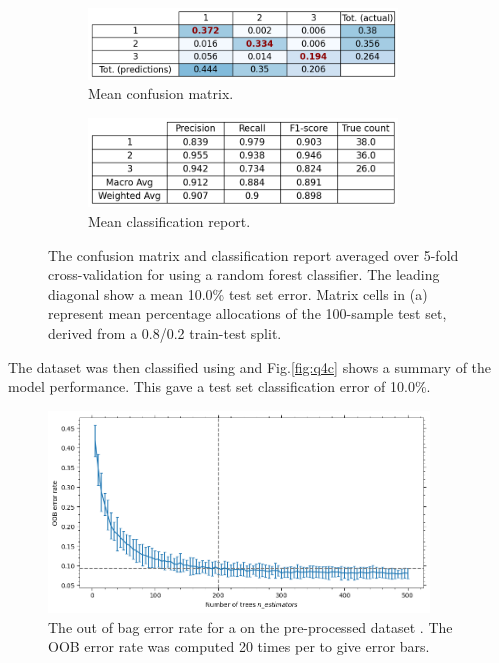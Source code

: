     \begin{figure}[htb]
    \centering
    \begin{subfigure}{0.5\textwidth}
        \centering
        \includegraphics[width=0.9\textwidth]{./figures/q4c_confusion_matrix}
        \caption{Mean confusion matrix.}
        \label{fig:q4c_confusion_matrix}
    \end{subfigure}%
    \begin{subfigure}{0.5\textwidth}
        \centering
        \includegraphics[width=0.9\textwidth]{./figures/q4c_classification_report}
        \caption{Mean classification report.}
        \label{fig:q4c_classification_report}
    \end{subfigure}
    \caption{The confusion matrix and classification report averaged over 5-fold cross-validation for
         using a random forest classifier.
        The leading diagonal show a mean 10.0\% test set error.
        Matrix cells in (a) represent mean percentage allocations of the 100-sample test set, derived from a 0.8/0.2
        train-test split.}
    \label{fig:q4c}
    \end{figure}

    The dataset was then classified using  and Fig.\eqref{fig:q4c} shows a summary
    of the model performance.
    This gave a test set classification error of 10.0\%.

    \begin{figure}[htb]
    \centering
    \includegraphics[width=0.9\textwidth]{./figures/q4d}
    \caption{The out of bag error rate for a  on the pre-processed dataset
        . The OOB error rate was computed 20 times per
         to give error bars.}
        \label{fig:q4d}
    \end{figure}

